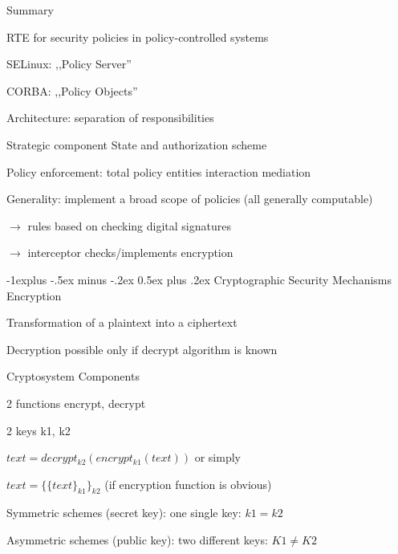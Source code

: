 \documentclass[a4paper]{article}
\makeatletter
\renewcommand{\subsection}{\@startsection{subsection}{2}{0mm}%
                {-1explus -.5ex minus -.2ex}%
                {0.5ex plus .2ex}%
                {\normalfont\normalsize\bfseries}}
\makeatother
\begin{document}
\begin{multicols}{3}
    Summary
    \begin{itemize*}
        \item RTE for security policies in policy-controlled systems
        \begin{itemize*}
            \item SELinux: ,,Policy Server''
            \item CORBA: ,,Policy Objects''
        \end{itemize*}
        \item Architecture: separation of responsibilities
        \item Strategic component State and authorization scheme
        \item Policy enforcement: total policy entities interaction mediation
        \item Generality: implement a broad scope of policies (all generally computable)
        \begin{itemize*}
            \item[$\rightarrow$] rules based on checking digital signatures
            \item[$\rightarrow$] interceptor checks/implements encryption
        \end{itemize*}
    \end{itemize*}

    \subsection{Cryptographic Security Mechanisms}
    Encryption
    \begin{itemize*}
        \item Transformation of a plaintext into a ciphertext
        \item Decryption possible only if decrypt algorithm is known
    \end{itemize*}

    Cryptosystem Components
    \begin{itemize*}
        \item 2 functions encrypt, decrypt
        \item 2 keys k1, k2
        \item $text = decrypt_{k2}(encrypt_{k1}(text))$ or simply
        \item $text = \{\{text\}_{k1}\}_{k2}$ (if encryption function is obvious)
        \item Symmetric schemes (secret key): one single key: $k1=k2$
        \item Asymmetric schemes (public key): two different keys: $K1\not=K2$
    \end{itemize*}


\end{multicols}
\end{document}
